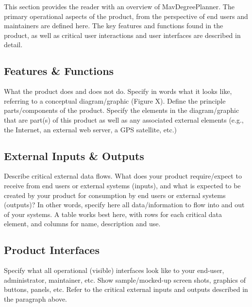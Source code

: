 
This section provides the reader with an overview of MavDegreePlanner.
The primary operational aspects of the product, from the perspective
of end users and maintainers are defined here. The key features and
functions found in the product, as well as critical user interactions
and user interfaces are described in detail.

\subsection{Features \& Functions}
What the product does and does not do. Specify in words what it looks
like, referring to a conceptual diagram/graphic (Figure X).  Define
the principle parts/components of the product. Specify the elements
in the diagram/graphic that are part(s) of this product as well as
any associated external elements (e.g., the Internet, an external
web server, a GPS satellite, etc.)

\subsection{External Inputs \& Outputs}
Describe critical external data flows. What does your product
require/expect to receive from end users or external systems (inputs),
and what is expected to be created by your product for consumption by
end users or external systems (outputs)? In other words, specify here
all data/information to flow into and out of your systems. A table
works best here, with rows for each critical data element, and columns
for name, description and use.

\subsection{Product Interfaces}
Specify what all operational (visible) interfaces look like to your
end-user, administrator, maintainer, etc. Show sample/mocked-up screen shots,
graphics of buttons, panels, etc. Refer to the critical external inputs
and outputs described in the paragraph above.
